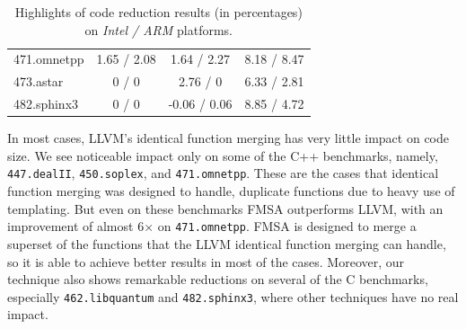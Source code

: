 \begin{table}[]
{\begin{tabular}{lccc}
471.omnetpp                               & 1.65 / 2.08        & 1.64 / 2.27   & 8.18 / 8.47             \\
\rowcolor{evencolor} 473.astar                                 & 0 / 0              & 2.76 / 0      & 6.33 / 2.81             \\
482.sphinx3                               & 0 / 0              & -0.06 / 0.06  & 8.85 / 4.72             \\
\bottomrule
\end{tabular}
}
\caption{Highlights of code reduction results (in percentages) on \textit{Intel / ARM} platforms. }
\end{table}

In most cases, LLVM's identical function merging has very little impact on code size. We see noticeable impact only on some of the C++
benchmarks, namely, \texttt{447.dealII}, \texttt{450.soplex}, and \texttt{471.omnetpp}. These are the cases that identical function merging
was designed to handle, duplicate functions due to heavy use of templating. But even on these benchmarks FMSA outperforms LLVM, with an
improvement of almost 6$\times$ on \texttt{471.omnetpp}. FMSA is designed to merge a superset of the functions that the LLVM identical
function merging can handle, so it is able to achieve better results in most of the cases. Moreover, our technique also shows remarkable
reductions on several of the C benchmarks, especially \texttt{462.libquantum} and \texttt{482.sphinx3}, where other techniques have no real
impact.


